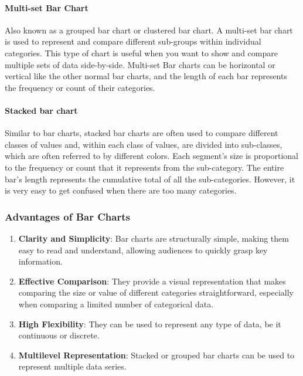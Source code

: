 \documentclass{article}\usepackage[]{graphicx}\usepackage[]{xcolor}
\begin{document}
\paragraph{Multi-set Bar Chart}
Also known as a grouped bar chart or clustered bar chart. A multi-set bar chart is used to represent and compare different sub-groups within individual categories. This type of chart is useful when you want to show and compare multiple sets of data side-by-side.
Multi-set Bar charts can be horizontal or vertical like the other normal bar charts, and the length of each bar represents the frequency or count of their categories.
\paragraph{Stacked bar chart}
Similar to bar charts, stacked bar charts are often used to compare different classes of values and, within each class of values, are divided into sub-classes, which are often referred to by different colors. Each segment's size is proportional to the frequency or count that it represents from the sub-category. The entire bar's length represents the cumulative total of all the sub-categories.
However, it is very easy to get confused when there are too many categories.

\subsubsection{Advantages of Bar Charts}
\begin{enumerate}
\item \textbf{Clarity and Simplicity}: Bar charts are structurally simple, making them easy to read and understand, allowing audiences to quickly grasp key information.
    \item \textbf{Effective Comparison}: They provide a visual representation that makes comparing the size or value of different categories straightforward, especially when comparing a limited number of categorical data.
    \item \textbf{High Flexibility}: They can be used to represent any type of data, be it continuous or discrete.
    \item \textbf{Multilevel Representation}: Stacked or grouped bar charts can be used to represent multiple data series.
\end{enumerate}
\end{document}
